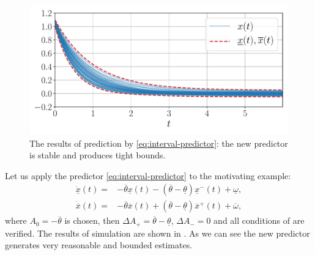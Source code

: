 \begin{example*}
	\begin{figure}[t]
		\begin{centering}
			\includegraphics[width=0.8\linewidth]{img/predictor}
			\par\end{centering}
		\caption{\label{fig:IP_New} The results of prediction by \eqref{eq:interval-predictor}: the new predictor is stable and produces tight bounds.}
	\end{figure}
	Let us apply the predictor \eqref{eq:interval-predictor}
	to the motivating example:
	\begin{align*}
		\dot{\underline{x}}(t) = {} & -\overline{\theta}\underline{x}(t) - (\overline{\theta}-\underline{\theta})\underline{x}^{-}(t) + \underline{\omega},\\
		\dot{\overline{x}}(t) =  {} & -\overline{\theta}\overline{x}(t) + (\overline{\theta}-\underline{\theta})\overline{x}^{+}(t) + \overline{\omega},
	\end{align*}
	where $A_{0}=-\overline{\theta}$ is chosen, then $\Delta A_{+}=\overline{\theta}-\underline{\theta}$, $\Delta A_{-}=0$ and all conditions of  are verified. The results of simulation are shown in . As we can see the new predictor generates very reasonable and bounded estimates. 
\end{example*}


